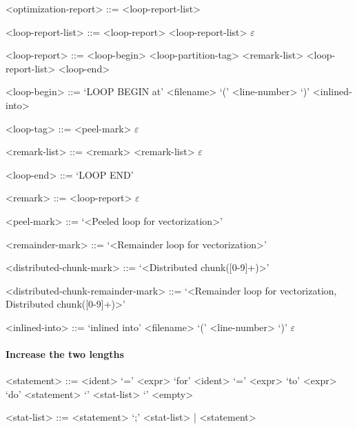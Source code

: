 \begin{grammar}
	
<optimization-report> ::= <loop-report-list>

<loop-report-list> ::= <loop-report> <loop-report-list> 
\alt $\varepsilon$
	
<loop-report> ::= <loop-begin> <loop-partition-tag> <remark-list> <loop-report-list> <loop-end>

<loop-begin> ::= `LOOP BEGIN at' <filename> `(' <line-number> `)' <inlined-into>

<loop-tag> ::= <peel-mark> 
\alt $\varepsilon$

<remark-list> ::= <remark> <remark-list>
\alt $\varepsilon$

<loop-end> ::= `LOOP END'

<remark> ::= <loop-report> 
\alt $\varepsilon$


<peel-mark> ::= `<Peeled loop for vectorization>'

<remainder-mark> ::= `<Remainder loop for vectorization>'

<distributed-chunk-mark> ::= `<Distributed chunk([0-9]+)>'

<distributed-chunk-remainder-mark> ::= `<Remainder loop for vectorization, Distributed chunk([0-9]+)>'

<inlined-into> ::= `inlined into' <filename> `(' <line-number> `)' 	
\alt $\varepsilon$
	
\end{grammar}


\paragraph{Increase the two lengths}
\setlength{\grammarparsep}{20pt plus 1pt minus 1pt} %
\setlength{\grammarindent}{12em} %

\begin{grammar}
	
	<statement> ::= <ident> `=' <expr> 
	\alt `for' <ident> `=' <expr> `to' <expr> `do' <statement> 
	\alt `{' <stat-list> `}' 
	\alt <empty> 
	
	<stat-list> ::= <statement> `;' <stat-list> | <statement> 
	
\end{grammar}